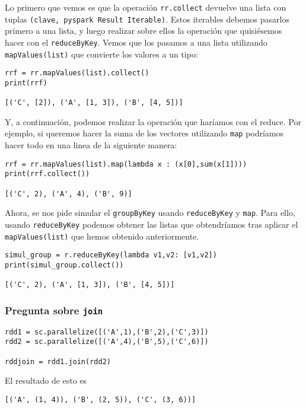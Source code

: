 \documentclass[11pt]{article}
\def\inline{\lstinline[basicstyle=\ttfamily,keywordstyle={}]}
\begin{document}
Lo primero que vemos es que la operación \inline{rr.collect} devuelve una lista con tuplas \inline{(clave, pyspark Result Iterable)}. Estos iterables debemos pasarlos primero a una lista, y luego realizar sobre ellos la operación que quisiésemos hacer con el \inline{reduceByKey}. Vemos que los pasamos a una lista utilizando \inline{mapValues(list)} que convierte los valores a un tipo:

\begin{verbatim}
rrf = rr.mapValues(list).collect()
print(rrf)

[('C', [2]), ('A', [1, 3]), ('B', [4, 5])]
\end{verbatim}

Y, a continuación, podemos realizar la operación que haríamos con el reduce. Por ejemplo, si queremos hacer la suma de los vectores utilizando \inline{map} podríamos hacer todo en una linea de la siguiente manera:
\begin{verbatim}
rrf = rr.mapValues(list).map(lambda x : (x[0],sum(x[1])))
print(rrf.collect())

[('C', 2), ('A', 4), ('B', 9)]
\end{verbatim}

Ahora, se nos pide simular el \inline{groupByKey} usando \inline{reduceByKey} y \inline{map}. Para ello, usando \inline{reduceByKey} podemos obtener las listas que obtendríamos tras aplicar el \inline{mapValues(list)} que hemos obtenido anteriormente.
\begin{verbatim}
simul_group = r.reduceByKey(lambda v1,v2: [v1,v2])
print(simul_group.collect())

[('C', 2), ('A', [1, 3]), ('B', [4, 5])]
\end{verbatim}

\subsubsection*{ Pregunta sobre \inline{join}}

\begin{verbatim}
rdd1 = sc.parallelize([('A',1),('B',2),('C',3)])
rdd2 = sc.parallelize([('A',4),('B',5),('C',6)])

rddjoin = rdd1.join(rdd2)
\end{verbatim}

El resultado de esto es 
\begin{verbatim}
[('A', (1, 4)), ('B', (2, 5)), ('C', (3, 6))]
\end{verbatim}
\end{document}
